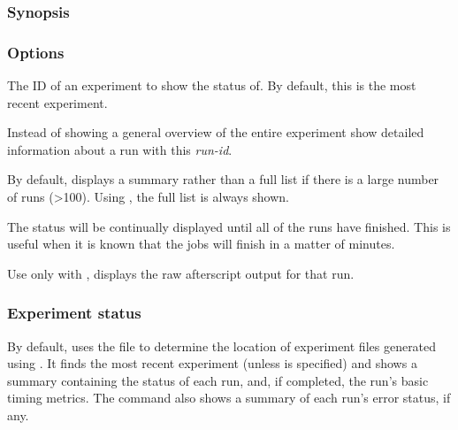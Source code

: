 \documentclass[a4paper,english]{article}
\begin{document}
\begin{adjustwidth}{18pt}{0pt}
            \subsubsection{Synopsis}
                 

            \subsubsection{Options}
                \begin{Description}[Options]
                  \item[\Arg{experiment-id}]
                    The ID of an experiment to show the status of.
                    By default, this is the most recent experiment.
                  \item[\OptArg{-i}{ run-id}]
                    Instead of showing a general overview of the entire experiment show detailed
                    information about a run with this \emph{run-id}.
                  \item[\Opt{\ddash full}]
                    By default,  displays a summary rather than a full list if there
                    is a large number of runs (>100). Using , the full list is
                    always shown.
                  \item[\Opt{\ddash follow}]
                    The status will be continually displayed until all of the runs have finished.
                    This is useful when it is known that the jobs will finish
                    in a matter of minutes.
                  \item[\Opt{\ddash after-out}]
                      Use only with , displays the raw afterscript output for that run.
                \end{Description}

            \subsubsection{Experiment status}
                By default,   uses the  file to determine the
                location of experiment files generated using  .
                It finds the most recent experiment (unless  is specified) and shows a summary
                containing the status of each run, and, if completed, the run's basic timing metrics.
                The command also shows a summary of each run's error status, if any.


\end{adjustwidth}
\end{document}
